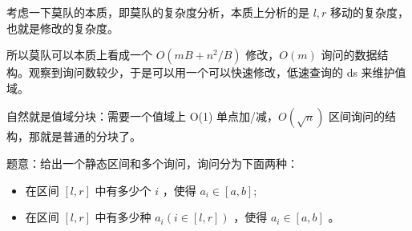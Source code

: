 \par \noindent 考虑一下莫队的本质，即莫队的复杂度分析，本质上分析的是 $l, r$ 移动的复杂度，也就是修改的复杂度。
~\\
\par \noindent 所以莫队可以本质上看成一个 $O(mB+n^2/B)$ 修改，$O(m)$ 询问的数据结构。观察到询问数较少，于是可以用一个可以快速修改，低速查询的 ds 来维护值域。
~\\
\par \noindent 自然就是值域分块：需要一个值域上 O(1) 单点加/减，$O(\sqrt n)$ 区间询问的结构，那就是普通的分块了。
~\\
\begin{tcolorbox}
\par \noindent 题意：给出一个静态区间和多个询问，询问分为下面两种：
\begin{itemize}
\item 在区间 $[l, r]$ 中有多少个 $i$ ，使得 $a_i \in[a, b]$;
\item 在区间 $[l, r]$ 中有多少种 $a_i(i \in[l, r])$ ，使得 $a_i \in[a, b]$ 。
\end{itemize}
\end{tcolorbox}
